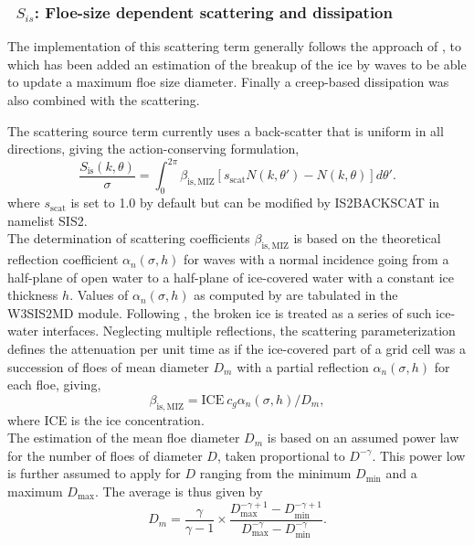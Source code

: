 \vsssub
\subsubsection{~$S_{is}$: Floe-size dependent scattering and dissipation} \label{sec:IS2}
\vsssub



The implementation of this scattering term generally 
follows the approach of \cite{art:MM06}, to which has been added an estimation of the breakup of the ice 
by waves to be able to update a maximum floe size diameter. Finally a creep-based dissipation was also 
combined with the scattering.  


The scattering source term currently uses a back-scatter that is uniform in 
all directions,  giving the action-conserving formulation, 
\begin{equation}
 \frac{S_{\mathrm{is}}(k,\theta)}{\sigma} =  \int_0^{2\pi}\beta_{\mathrm{is},\mathrm{MIZ}} [s_\mathrm{scat}  N(k,\theta')-N(k,\theta)] d\theta'  .
 \end{equation}
where $s_\mathrm{scat}$ is set to 1.0 by default but can be modified by 
{\code IS2BACKSCAT} in namelist {\F SIS2}. \\


The determination of scattering coefficients  $\beta_{\mathrm{is},\mathrm{MIZ}}$ is based on the theoretical 
reflection coefficient $\alpha_n(\sigma,h)$
for waves with a normal incidence going from a half-plane of open water to a half-plane of ice-covered water with a 
constant ice thickness $h$.  Values of $\alpha_n(\sigma,h)$ as computed by \cite{art:KM08} are tabulated 
in the {\code W3SIS2MD} module. Following \cite{art:Dea11}, the broken ice is treated as a series of 
such ice-water interfaces. Neglecting multiple reflections, the scattering parameterization defines the attenuation 
per unit time as if the ice-covered part of a grid cell was a succession of floes of mean diameter $D_{m}$ with a partial 
reflection $\alpha_n(\sigma,h)$ for each floe, giving, 
\begin{equation}
\beta_{\mathrm{is},\mathrm{MIZ}}=\mathrm{ICE}~c_g \alpha_n(\sigma,h) / D_{m},
 \end{equation}
where ICE is the ice concentration. \\
 

The estimation of the mean floe diameter $D_m$ is based on an assumed power law for the number of 
floes of diameter $D$, taken  proportional to $D^{-\gamma}$. This power low is further assumed to 
apply for $D$ ranging from 
the minimum $D_{\min}$ and a maximum $D_{\max}$. The average is thus given by  
\begin{equation}
D_m=\frac{\gamma}{\gamma -1}\times\frac{D_{\max}^{-\gamma +1}-D_{\min}^{-\gamma +1}}{D_{\max}^{-\gamma}-D_{\min}^{-\gamma}}.
\label{analytic_Dbar}
\end{equation}

